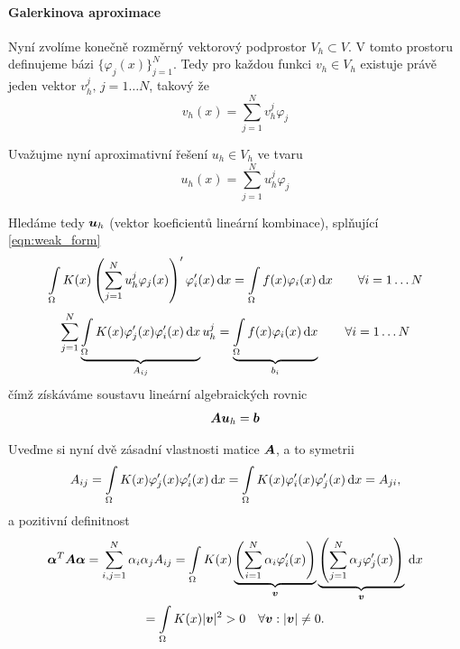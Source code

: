 \paragraph{Galerkinova aproximace}
Nyní zvolíme konečně rozměrný vektorový podprostor $V_h\subset V$.
V tomto prostoru definujeme bázi $\{\varphi_j(x)\}_{j=1}^N$.
Tedy pro každou funkci $v_h\in V_h$ existuje právě jeden vektor $v_h^j,\, j=1\ldots N$,
takový že 
\[
  v_h(x) = \sum\limits_{j=1}^N v_h^j \varphi_j
\]

Uvažujme nyní aproximativní řešení $u_h\in V_h$ ve tvaru
\[
  u_h(x) = \sum\limits_{j=1}^N u^j_h \varphi_j
\]

Hledáme tedy $\mathbf{\boldsymbol{u}}_h$ (vektor  koeficientů lineární kombinace), splňující \eqref{eqn:weak_form}
\[
  \int\limits_{\Omega} K(x) \left( \sum\limits_{j=1}^N u^j_h \varphi_j(x) \right)' \varphi_i'(x) \,{\rm d} x
    = \int\limits_{\Omega} f(x) \varphi_i(x) \,{\rm d} x \qquad \forall i=1\ldots N \label{eqn:discrete_weak_form}
\]
\begin{equation}
\sum\limits_{j=1}^N \underbrace{ \int\limits_{\Omega} K(x) \varphi'_j(x) \varphi_i'(x) \,{\rm d} x }_{A_{ij}} u^j_h
    = \underbrace{ \int\limits_{\Omega} f(x) \varphi_i(x) \,{\rm d} x }_{b_i} \qquad \forall i=1\ldots N \label{eqn:discrete_weak_form}
\end{equation}
čímž získáváme soustavu lineární algebraických rovnic
\begin{equation}
  \mathbf{\boldsymbol{A}} \mathbf{\boldsymbol{u}}_h = \mathbf{\boldsymbol{b}}\label{eqn:linear_system}
\end{equation}

Uveďme si nyní dvě zásadní vlastnosti matice $\mathbf{\boldsymbol{A}}$, a to symetrii
\begin{equation}
  A_{ij} = \int\limits_{\Omega} K(x) \varphi'_j(x) \varphi_i'(x) \,{\rm d} x = \int\limits_{\Omega} K(x) \varphi'_i(x) \varphi_j'(x) \,{\rm d} x = A_{ji}, \label{eqn:linear_system_symetry}
\end{equation}
a pozitivní definitnost
\begin{multline}
  \mathbf{\boldsymbol{\alpha}}^T \mathbf{\boldsymbol{A}} \mathbf{\boldsymbol{\alpha}} = \sum\limits_{i,j=1}^N \alpha_i \alpha_j A_{ij}
  = \int\limits_{\Omega} K(x)
    \underbrace{\left( \sum\limits_{i=1}^N \alpha_i \varphi'_i(x) \right)}_{\mathbf{\boldsymbol{v}}}
    \underbrace{\left( \sum\limits_{j=1}^N \alpha_j \varphi'_j(x) \right)}_{\mathbf{\boldsymbol{v}}} \,{\rm d} x \\
  = \int\limits_{\Omega} K(x) |\mathbf{\boldsymbol{v}}|^2 > 0 \quad \forall \mathbf{\boldsymbol{v}}: |\mathbf{\boldsymbol{v}}|\neq 0. \label{eqn:linear_system_pos_def}
\end{multline}
    
    
    
